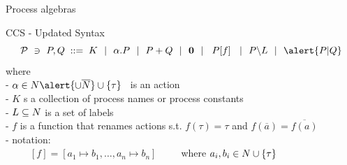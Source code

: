 \documentclass[aspectratio=169]{beamer}
\begin{document}
\begin{slide}{Process algebras}
\small

\begin{block}{CCS - \alert{Updated} Syntax}
\begin{equation*}
\mathcal{P} ~\ni~ P,Q\; ::=\; K ~~|~~ \alpha.P ~~|~~ P + Q ~~|~~ \cnil
        ~~|~~ \crn P f  ~~|~~ P\backslash L ~~|~~ \alert{P|Q}
\end{equation*}
%
where
\\- $\alpha \in \Act \alert{\cup \overline\Act}
    \cup \set{\tau}$~ is an action
\\- $K$ s a collection of process names or process constants
\\- $L \subseteq \Act %
    $ is a set of labels
\\- $f$ is a function that renames actions s.t. $f(\tau) = \tau$  \alert{and $f(\overline{a}) = \overline{f(a)}$}
\\- notation:
\\~~~~~$[f] = [a_1\mapsto b_1,\ldots,a_n \mapsto b_n]$~~~~~where \alert{$a_i,b_i \in N \cup \left\{ \tau \right\}$}
\end{block}
\end{slide}

\end{document}
